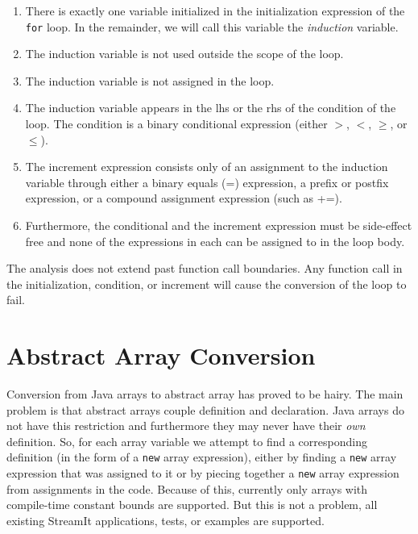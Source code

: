\documentclass[10pt, letterpaper, onecolumn]{article}
\begin{document}
\begin{enumerate}
\item There is exactly one variable initialized in the initialization
  expression of the {\tt for} loop.  In the remainder, we will call
  this variable the {\it induction} variable.
\item The induction variable is not used outside the scope of the
  loop.
\item The induction variable is not assigned in the loop.
\item The induction variable appears in the lhs or the rhs of the 
  condition of the loop.  The condition is a binary conditional
  expression (either $>$, $<$, $\ge$, or $\le$).
\item The increment expression consists only of an assignment to the
  induction variable through either a binary equals (=) expression, a
  prefix or postfix expression, or a compound assignment expression
  (such as +=).
\item Furthermore, the conditional and the increment expression must
  be side-effect free and none of the expressions in each can be
  assigned to in the loop body.  
\end{enumerate}

The analysis does not extend past function call boundaries.  Any
function call in the initialization, condition, or increment will
cause the conversion of the loop to fail.

\section{Abstract Array Conversion}
\label{array}
Conversion from Java arrays to abstract array has proved to be hairy.
The main problem is that abstract arrays couple definition and
declaration.  Java arrays do not have this restriction and furthermore
they may never have their {\it own} definition.  So, for each array
variable we attempt to find a corresponding definition (in the form of
a {\tt new} array expression), either by finding a {\tt new} array
expression that was assigned to it or by piecing together a {\tt new}
array expression from assignments in the code.  Because of this,
currently only arrays with compile-time constant bounds are supported.
But this is not a problem, all existing StreamIt applications, tests,
or examples are supported.
\end{document}
